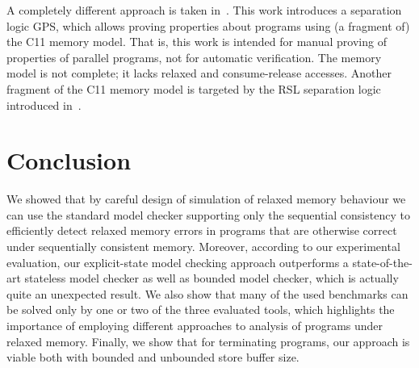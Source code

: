 A completely different approach is taken in~\cite{Turon2014}.
This work introduces a separation logic GPS, which allows proving properties about programs using (a fragment of) the C11 memory model.
That is, this work is intended for manual proving of properties of parallel programs, not for automatic verification.
The memory model is not complete; it lacks relaxed and consume-release accesses.
Another fragment of the C11 memory model is targeted by the RSL separation logic introduced in~\cite{Vafeiadis2013}.


\section{Conclusion} \label{sec:conclusion}

We showed that by careful design of simulation of relaxed memory behaviour we
can use the standard model checker supporting only the sequential consistency to
efficiently detect relaxed memory errors in programs that are otherwise correct
under sequentially consistent memory. Moreover, according to our experimental
evaluation, our explicit-state model checking approach outperforms
a state-of-the-art stateless model checker as well as bounded model checker,
which is actually quite an unexpected result. We also show that many of the used
benchmarks can be solved only by one or two of the three evaluated tools, which
highlights the importance of employing different approaches to analysis of programs
under relaxed memory. Finally, we show that for terminating programs, our
approach is viable both with bounded and unbounded store buffer size.
